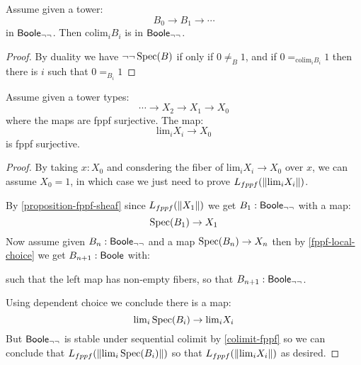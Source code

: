 \begin{lemma}\label{colimit-fppf}
Assume given a tower:
\[B_0\to B_1\to \cdots\]
in $\mathsf{Boole}_{\neg\neg}$. Then $\mathrm{colim}_i B_i$ is in $\mathsf{Boole}_{\neg\neg}$.
\end{lemma}

\begin{proof}
By duality we have $\neg\neg\operatorname{Spec}(B)$ if only if $0\not=_B1$, and if $0=_{\mathrm{colim}_iB_i}1$ then there is $i$ such that $0=_{B_i}1$
\end{proof}

\begin{lemma}\label{dependent-choice-fppf}
Assume given a tower types:
\[\cdots \to X_2\to X_1 \to X_0 \]
where the maps are fppf surjective. The map:
\[\mathrm{lim}_i X_i\to X_0\]
is fppf surjective.
\end{lemma}

\begin{proof}
By taking $x:X_0$ and consdering the fiber of $\mathrm{lim}_i X_i\to X_0$ over $x$, we can assume $X_0=1$, in which case we just need to prove $L_{fppf}(\lVert \mathrm{lim}_iX_i \rVert)$.

By \cref{proposition-fppf-sheaf} since $L_{fppf}(\lVert X_1 \rVert)$ we get $B_1:\mathsf{Boole}_{\neg\neg}$ with a map:
\[\operatorname{Spec}(B_1)\to X_1\]
Now assume given $B_n:\mathsf{Boole}_{\neg\neg}$ and a map $\operatorname{Spec}(B_n)\to X_n$ then by \cref{fppf-local-choice} we get $B_{n+1}:\mathsf{Boole}$ with:
\begin{center}
\end{center}
such that the left map has non-empty fibers, so that $B_{n+1}:\mathsf{Boole}_{\neg\neg}$.

Using dependent choice we conclude there is a map:
\[\mathrm{lim}_i\operatorname{Spec}(B_i) \to \mathrm{lim}_iX_i\]
But $\mathsf{Boole}_{\neg\neg}$ is stable under sequential colimit by \cref{colimit-fppf} so we can conclude that $L_{fppf}(\lVert \mathrm{lim}_i\operatorname{Spec}(B_i) \rVert)$ so that $L_{fppf}(\lVert \mathrm{lim}_iX_i \rVert)$ as desired.
\end{proof}

